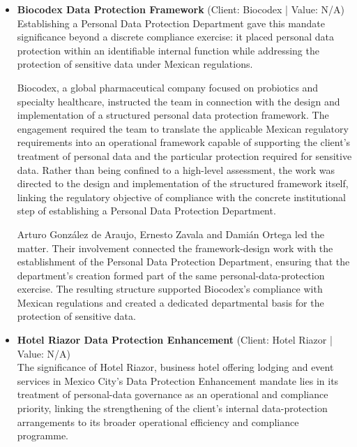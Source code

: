 \documentclass[11pt]{article}
\begin{document}
\begin{itemize}
MEGA DIRECT, S.A. de C.V. instructed the team on complex data protection and database-related matters arising in a highly regulated environment. The work addressed the legally sensitive connection between the acquisition of data, its subsequent processing and storage, and its protection, with each element forming part of the proceedings in which the client was represented. By addressing those interrelated issues through legal representation, the team ensured business continuity for MEGA DIRECT, S.A. de C.V. while the relevant data and database-related matters were under consideration.

Arturo González de Araujo, Ernesto Zavala, and Damián Ortega led the mandate. Their involvement evidences a senior-led response to proceedings in which the client’s continued ability to manage data acquisition, processing, storage, and protection was directly relevant to business continuity in a highly regulated environment.
\item \textbf{Biocodex Data Protection Framework} (Client: Biocodex | Value: N/A)\\ Establishing a Personal Data Protection Department gave this mandate significance beyond a discrete compliance exercise: it placed personal data protection within an identifiable internal function while addressing the protection of sensitive data under Mexican regulations.

Biocodex, a global pharmaceutical company focused on probiotics and specialty healthcare, instructed the team in connection with the design and implementation of a structured personal data protection framework. The engagement required the team to translate the applicable Mexican regulatory requirements into an operational framework capable of supporting the client’s treatment of personal data and the particular protection required for sensitive data. Rather than being confined to a high-level assessment, the work was directed to the design and implementation of the structured framework itself, linking the regulatory objective of compliance with the concrete institutional step of establishing a Personal Data Protection Department.

Arturo González de Araujo, Ernesto Zavala and Damián Ortega led the matter. Their involvement connected the framework-design work with the establishment of the Personal Data Protection Department, ensuring that the department’s creation formed part of the same personal-data-protection exercise. The resulting structure supported Biocodex’s compliance with Mexican regulations and created a dedicated departmental basis for the protection of sensitive data.
\item \textbf{Hotel Riazor Data Protection Enhancement} (Client: Hotel Riazor | Value: N/A)\\ The significance of Hotel Riazor, business hotel offering lodging and event services in Mexico City’s Data Protection Enhancement mandate lies in its treatment of personal-data governance as an operational and compliance priority, linking the strengthening of the client’s internal data-protection arrangements to its broader operational efficiency and compliance programme.


\end{itemize}
\end{document}
